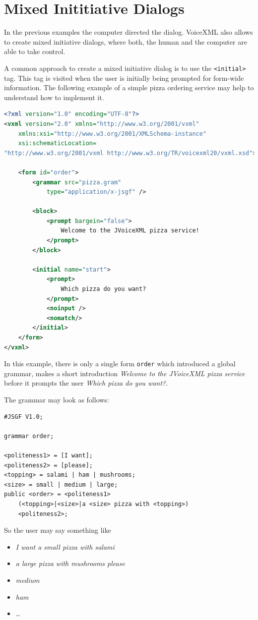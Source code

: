 \documentclass[11pt,a4paper]{book}
\begin{document}
\section{Mixed Inititiative Dialogs}

In the previous examples the computer directed the dialog. VoiceXML also allows
to create mixed initiative dialogs, where both, the human and the computer
are able to take control.

A common approach to create a mixed initiative dialog is to use the
\lstinline{<initial>} tag.
This tag is visited when the user is initially being prompted for form-wide
information.
The following example of a simple pizza ordering service may help to understand
how to implement it.

\begin{lstlisting}[language=XML]
<?xml version="1.0" encoding="UTF-8"?>
<vxml version="2.0" xmlns="http://www.w3.org/2001/vxml"
    xmlns:xsi="http://www.w3.org/2001/XMLSchema-instance"
    xsi:schematicLocation=
"http://www.w3.org/2001/vxml http://www.w3.org/TR/voicexml20/vxml.xsd">

    <form id="order">
        <grammar src="pizza.gram"
            type="application/x-jsgf" />

        <block>
            <prompt bargein="false">
                Welcome to the JVoiceXML pizza service!
            </prompt>
        </block>

        <initial name="start">
            <prompt>
                Which pizza do you want?
            </prompt>
            <noinput />
            <nomatch/>
        </initial>
    </form>
</vxml>
\end{lstlisting}

In this example, there is only a single form \lstinline{order} which introduced
a global grammar, makes a short introduction \emph{Welcome to the JVoiceXML
pizza service} before it prompts the user \emph{Which pizza do you want?}.

The grammar may look as follows:
\begin{lstlisting}
#JSGF V1.0; 

grammar order;

<politeness1> = [I want];
<politeness2> = [please];
<topping> = salami | ham | mushrooms;
<size> = small | medium | large;
public <order> = <politeness1>
    (<topping>|<size>|a <size> pizza with <topping>)
    <politeness2>;
\end{lstlisting}

So the user may say something like
\begin{itemize}
  \item \emph{I want a small pizza with salami}
  \item \emph{a large pizza with mushrooms please}
  \item \emph{medium}
  \item \emph{ham}
  \item \ldots
\end{itemize}
\end{document}
